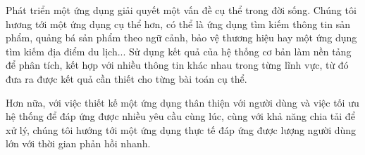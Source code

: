 Phát triển một ứng dụng giải quyết một vấn đề cụ thể trong đời sống. Chúng tôi hương tới một ứng dụng cụ thể hơn, có thể là ứng dụng tìm kiếm thông tin sản phẩm, quảng bá sản phẩm theo ngữ cảnh, bảo vệ thương hiệu hay một ứng dụng tìm kiếm địa điểm du lịch... Sử dụng kết quả của hệ thống cơ bản làm nền tảng để phân tích, kết hợp với nhiều thông tin khác nhau trong từng lĩnh vực, từ đó đưa ra được kết quả cần thiết cho từng bài toán cụ thể.

Hơn nữa, với việc thiết kế một ứng dụng thân thiện với người dùng và việc tối ưu hệ thống để đáp ứng được nhiều yêu cầu cùng lúc, cùng với khả năng chia tải để xử lý, chúng tôi hướng tới một ứng dụng thực tế đáp ứng được lượng người dùng lớn với thời gian phản hồi nhanh.



